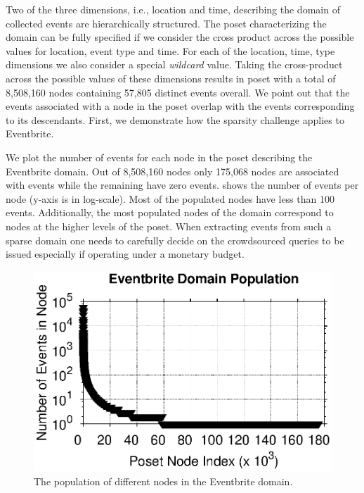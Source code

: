 Two of the three dimensions, i.e., location and time, describing the domain of collected events  are hierarchically structured. The poset characterizing the domain can be fully specified if we consider the cross product across the possible values for location, event type and time. For each of the location, time, type dimensions we also consider a special {\em wildcard} value. Taking the cross-product across the possible values of these dimensions results in poset with a total of 8,508,160 nodes containing 57,805 distinct events overall. We point out that the events associated with a node in the poset overlap with the events corresponding to its descendants. First, we demonstrate how the sparsity challenge applies to Eventbrite.
\begin{example}
We plot the number of events for each node in the poset describing the Eventbrite domain. Out of 8,508,160 nodes only 175,068 nodes are associated with events while the remaining have zero events.  shows the number of events per node (y-axis is in log-scale). Most of the populated nodes have less than 100 events. Additionally, the most populated nodes of the domain correspond to nodes at the higher levels of the poset. When extracting events from such a sparse domain one needs to carefully decide on the crowdsourced queries to be issued especially if operating under a monetary budget.
\end{example}
\iftr
\begin{figure}
	\begin{center}
	\includegraphics[clip,scale=0.5]{figs/eventbritepop.eps}
	\vspace{-15pt}
	\caption{The population of different nodes in the Eventbrite domain.}
	\label{fig:eventbritepop}
	\vspace{-20pt}
	\end{center}
\end{figure}
\fi

